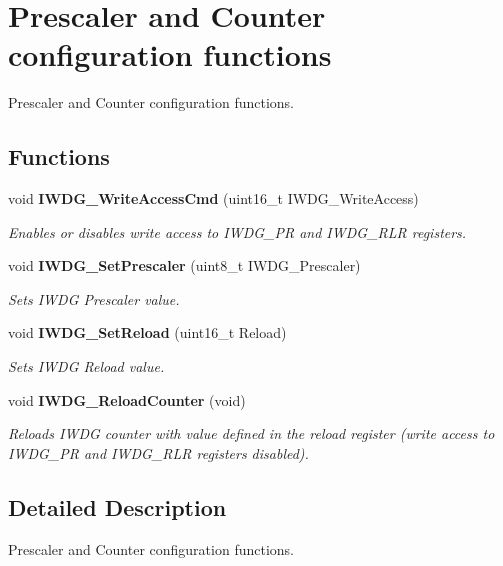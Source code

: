 \section{Prescaler and Counter configuration functions}
\label{group__IWDG__Group1}


Prescaler and Counter configuration functions.  


\subsection*{Functions}
\begin{DoxyCompactItemize}
\item 
void \textbf{ I\+W\+D\+G\+\_\+\+Write\+Access\+Cmd} (uint16\+\_\+t I\+W\+D\+G\+\_\+\+Write\+Access)
\begin{DoxyCompactList}\small\item\em Enables or disables write access to I\+W\+D\+G\+\_\+\+PR and I\+W\+D\+G\+\_\+\+R\+LR registers. \end{DoxyCompactList}\item 
void \textbf{ I\+W\+D\+G\+\_\+\+Set\+Prescaler} (uint8\+\_\+t I\+W\+D\+G\+\_\+\+Prescaler)
\begin{DoxyCompactList}\small\item\em Sets I\+W\+DG Prescaler value. \end{DoxyCompactList}\item 
void \textbf{ I\+W\+D\+G\+\_\+\+Set\+Reload} (uint16\+\_\+t Reload)
\begin{DoxyCompactList}\small\item\em Sets I\+W\+DG Reload value. \end{DoxyCompactList}\item 
void \textbf{ I\+W\+D\+G\+\_\+\+Reload\+Counter} (void)
\begin{DoxyCompactList}\small\item\em Reloads I\+W\+DG counter with value defined in the reload register (write access to I\+W\+D\+G\+\_\+\+PR and I\+W\+D\+G\+\_\+\+R\+LR registers disabled). \end{DoxyCompactList}\end{DoxyCompactItemize}


\subsection{Detailed Description}
Prescaler and Counter configuration functions. 

